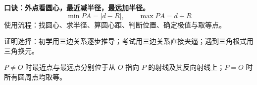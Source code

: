 \begin{summarybox}
\textbf{口诀：外点看圆心，最近减半径，最远加半径。}
\[\boxed{\min PA=|d-R|,\qquad \max PA=d+R}\]
使用流程：找圆心、求半径、算圆心距、判断位置、确定极值与取等点。

证明选择：初学用三边关系逐步推导；考试用三边关系直接夹逼；遇到三角根式用三角换元。

$P\ne O$ 时最近点与最远点分别位于从 $O$ 指向 $P$ 的射线及其反向射线上；$P=O$ 时所有圆周点均取等。
\end{summarybox}

